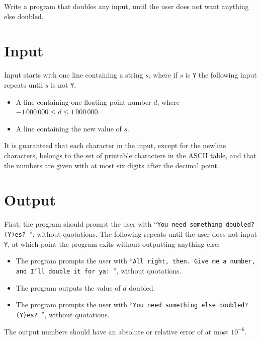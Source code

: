 
Write a program that doubles any input, until the user does not want anything else doubled.

\section*{Input}

Input starts with one line containing a string $s$, where if $s$ is \texttt{Y} the following input repeats until $s$ is not \texttt{Y}. 
\begin{itemize}
    \item A line containing one floating point number $d$, where $-1\,000\,000 \leq d \leq 1\,000\,000$.
    \item A line containing the new value of $s$.
\end{itemize}
It is guaranteed that each character in the input, except for the newline characters,
belongs to the set of printable characters in the ASCII table,
and that the numbers are given with at most six digits after the decimal point.

\section*{Output}

First, the program should prompt the user with ``\texttt{You need something doubled? (Y)es? }'', without quotations.
The following repeats until the user does not input \texttt{Y}, at which point the program exits without outputting anything else:
\begin{itemize}
    \item The program prompts the user with ``\texttt{All right, then. Give me a number, and I'll double it for ya: }'', without quotations.
    \item The program outputs the value of $d$ doubled.
    \item The program prompts the user with ``\texttt{You need something else doubled? (Y)es? }'', without quotations.
\end{itemize}
The output numbers should have an absolute or relative error of at most $10^{-6}$.
